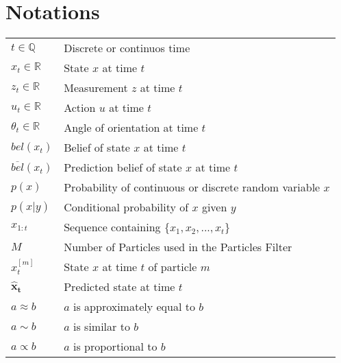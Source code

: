 \section{Notations}
\begin{flushleft}
\begin{tabular}{l l}
$t \in \mathbb{Q}$ & Discrete or continuos time\\
$x_t \in \mathbb{R}$ & State $x$ at time $t$\\
$z_t \in \mathbb{R}$  & Measurement $z$ at time $t$\\
$u_t \in \mathbb{R}$ & Action $u$ at time $t$\\
$\theta_t \in \mathbb{R}$ & Angle of orientation at time $t$\\
$bel(x_t)$ & Belief of state $x$ at time $t$\\
$\overline{bel}(x_t)$ & Prediction belief of state $x$ at time $t$\\
$p(x)$ & Probability of continuous or discrete random variable $x$\\
$p(x | y)$ & Conditional probability of $x$ given $y$\\
$x_{1:t}$ & Sequence containing $\{x_1, x_2, ..., x_t\}$\\ 
$M$ & Number of Particles used in the Particles Filter\\
$x_t^{[m]}$ & State $x$ at time $t$ of particle $m$\\
$\mathbf{\hat{x}_{t}}$ & Predicted state at time $t$\\
$a \approx b$ & $a$ is approximately equal to $b$\\
$a \sim b$ & $a$ is similar to $b$\\
$a \propto b$ & $a$ is proportional to $b$\\
\end{tabular}
\end{flushleft}

